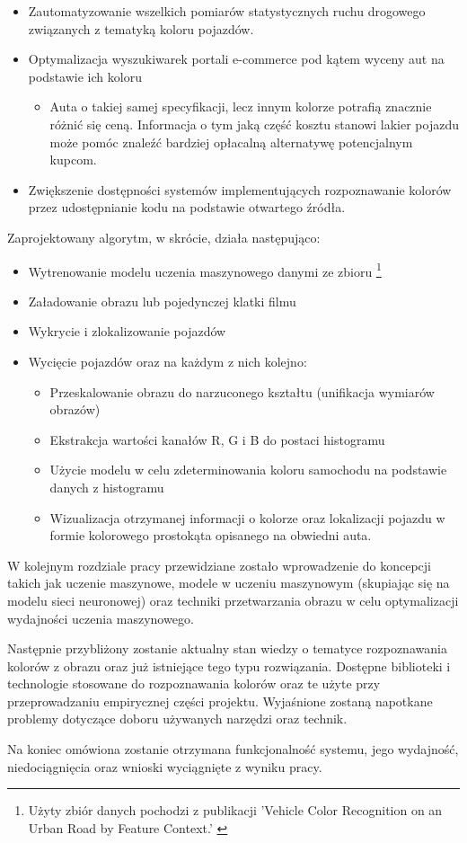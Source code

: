 \begin{itemize}

    \item Zautomatyzowanie wszelkich pomiarów statystycznych ruchu drogowego związanych z tematyką koloru pojazdów.
    
    \item Optymalizacja wyszukiwarek portali e-commerce pod kątem wyceny aut na podstawie ich koloru
    \begin{itemize}
        \item Auta o takiej samej specyfikacji, lecz innym kolorze potrafią znacznie różnić się ceną. Informacja o tym jaką część kosztu stanowi lakier pojazdu może pomóc znaleźć bardziej opłacalną alternatywę potencjalnym kupcom.
    \end{itemize}
    
    \item Zwiększenie dostępności systemów implementujących rozpoznawanie kolorów przez udostępnianie kodu na podstawie otwartego źródła.
\end{itemize}
Zaprojektowany algorytm, w skrócie, działa następująco:
\begin{itemize}
    \item Wytrenowanie modelu uczenia maszynowego danymi ze zbioru
    \footnote{Użyty zbiór danych pochodzi z publikacji 'Vehicle Color Recognition on an Urban Road by Feature Context.' \cite{chen_ref}}
    \item Załadowanie obrazu lub pojedynczej klatki filmu
    \item Wykrycie i zlokalizowanie pojazdów
    \item Wycięcie pojazdów oraz na każdym z nich kolejno:
        \begin{itemize}
            \item Przeskalowanie obrazu do narzuconego kształtu (unifikacja wymiarów obrazów)
            \item Ekstrakcja wartości kanałów R, G i B do postaci histogramu
            \item Użycie modelu w celu zdeterminowania koloru samochodu na podstawie danych z histogramu
            \item Wizualizacja otrzymanej informacji o kolorze oraz lokalizacji pojazdu w formie kolorowego prostokąta opisanego na obwiedni auta.
        \end{itemize}
\end{itemize}

W kolejnym rozdziale pracy przewidziane zostało wprowadzenie do koncepcji takich jak uczenie maszynowe, modele w uczeniu maszynowym (skupiając się na modelu sieci neuronowej)  oraz techniki przetwarzania obrazu w celu optymalizacji wydajności uczenia maszynowego.

Następnie przybliżony zostanie aktualny stan wiedzy o tematyce rozpoznawania kolorów z obrazu oraz już istniejące tego typu rozwiązania. 
Dostępne biblioteki i technologie stosowane do rozpoznawania kolorów oraz te użyte przy przeprowadzaniu empirycznej części projektu. Wyjaśnione zostaną napotkane problemy dotyczące doboru używanych narzędzi oraz technik.

Na koniec omówiona zostanie otrzymana funkcjonalność systemu, jego wydajność, niedociągnięcia oraz wnioski wyciągnięte z wyniku pracy.